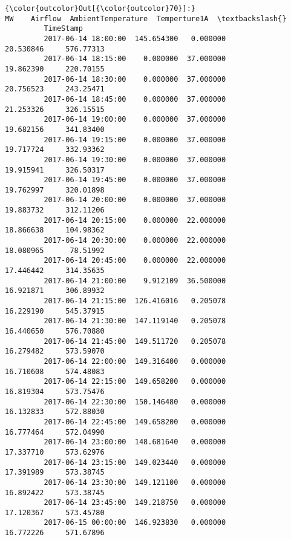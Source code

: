 \documentclass[11pt]{article}
\begin{document}
\begin{Verbatim}[commandchars=\\\{\}]
{\color{outcolor}Out[{\color{outcolor}70}]:}                              MW    Airflow  AmbientTemperature  Temperture1A  \textbackslash{}
         TimeStamp                                                                      
         2017-06-14 18:00:00  145.654300   0.000000           20.530846     576.77313   
         2017-06-14 18:15:00    0.000000  37.000000           19.862390     220.70155   
         2017-06-14 18:30:00    0.000000  37.000000           20.756523     243.25471   
         2017-06-14 18:45:00    0.000000  37.000000           21.253326     326.15515   
         2017-06-14 19:00:00    0.000000  37.000000           19.682156     341.83400   
         2017-06-14 19:15:00    0.000000  37.000000           19.717724     332.93362   
         2017-06-14 19:30:00    0.000000  37.000000           19.915941     326.50317   
         2017-06-14 19:45:00    0.000000  37.000000           19.762997     320.01898   
         2017-06-14 20:00:00    0.000000  37.000000           19.883732     312.11206   
         2017-06-14 20:15:00    0.000000  22.000000           18.866638     104.98362   
         2017-06-14 20:30:00    0.000000  22.000000           18.080965      78.51992   
         2017-06-14 20:45:00    0.000000  22.000000           17.446442     314.35635   
         2017-06-14 21:00:00    9.912109  36.500000           16.921871     306.89932   
         2017-06-14 21:15:00  126.416016   0.205078           16.229190     545.37915   
         2017-06-14 21:30:00  147.119140   0.205078           16.440650     576.70880   
         2017-06-14 21:45:00  149.511720   0.205078           16.279482     573.59070   
         2017-06-14 22:00:00  149.316400   0.000000           16.710608     574.48083   
         2017-06-14 22:15:00  149.658200   0.000000           16.819304     573.75476   
         2017-06-14 22:30:00  150.146480   0.000000           16.132833     572.88030   
         2017-06-14 22:45:00  149.658200   0.000000           16.777464     572.04990   
         2017-06-14 23:00:00  148.681640   0.000000           17.337710     573.62976   
         2017-06-14 23:15:00  149.023440   0.000000           17.391989     573.38745   
         2017-06-14 23:30:00  149.121100   0.000000           16.892422     573.38745   
         2017-06-14 23:45:00  149.218750   0.000000           17.120367     573.45780   
         2017-06-15 00:00:00  146.923830   0.000000           16.772226     571.67896   
         

\end{Verbatim}
\end{document}
